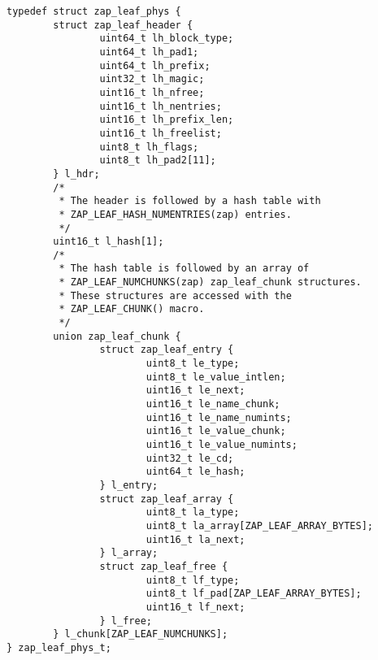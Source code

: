 \begin{lstlisting}[style=c]
typedef struct zap_leaf_phys {
        struct zap_leaf_header {
                uint64_t lh_block_type;
                uint64_t lh_pad1;
                uint64_t lh_prefix;
                uint32_t lh_magic;
                uint16_t lh_nfree;
                uint16_t lh_nentries;
                uint16_t lh_prefix_len;
                uint16_t lh_freelist;
                uint8_t lh_flags;
                uint8_t lh_pad2[11];
        } l_hdr;
        /*
         * The header is followed by a hash table with
         * ZAP_LEAF_HASH_NUMENTRIES(zap) entries.
         */
        uint16_t l_hash[1];
        /*
         * The hash table is followed by an array of
         * ZAP_LEAF_NUMCHUNKS(zap) zap_leaf_chunk structures.
         * These structures are accessed with the
         * ZAP_LEAF_CHUNK() macro.
         */
        union zap_leaf_chunk {
                struct zap_leaf_entry {
                        uint8_t le_type;
                        uint8_t le_value_intlen;
                        uint16_t le_next;
                        uint16_t le_name_chunk;
                        uint16_t le_name_numints;
                        uint16_t le_value_chunk;
                        uint16_t le_value_numints;
                        uint32_t le_cd;
                        uint64_t le_hash;
                } l_entry;
                struct zap_leaf_array {
                        uint8_t la_type;
                        uint8_t la_array[ZAP_LEAF_ARRAY_BYTES];
                        uint16_t la_next;
                } l_array;
                struct zap_leaf_free {
                        uint8_t lf_type;
                        uint8_t lf_pad[ZAP_LEAF_ARRAY_BYTES];
                        uint16_t lf_next;
                } l_free;
        } l_chunk[ZAP_LEAF_NUMCHUNKS];
} zap_leaf_phys_t;
\end{lstlisting}

